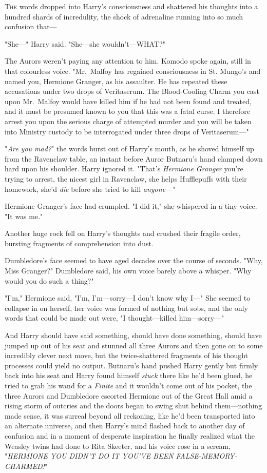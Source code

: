 
\lettrine{T}{he} words dropped into Harry's consciousness and shattered his thoughts into a
hundred shards of incredulity, the shock of adrenaline running into so much
confusion that---

"She---" Harry said. "She---she wouldn't---WHAT?"

The Aurors weren't paying any attention to him. Komodo spoke again, still in
that colourless voice. "Mr.~Malfoy has regained consciousness in St. Mungo's and
named you, Hermione Granger, as his assaulter. He has repeated these
accusations under two drops of Veritaserum. The Blood-Cooling Charm you cast
upon Mr.~Malfoy would have killed him if he had not been found and treated, and
it must be presumed known to you that this was a fatal curse. I therefore
arrest you upon the serious charge of attempted murder and you will be taken
into Ministry custody to be interrogated under three drops of Veritaserum---"

"\emph{Are you mad?}" the words burst out of Harry's mouth, as he shoved
himself up from the Ravenclaw table, an instant before Auror Butnaru's hand
clamped down hard upon his shoulder. Harry ignored it. "That's \emph{Hermione
Granger} you're trying to arrest, the nicest girl in Ravenclaw, she helps
Hufflepuffs with their homework, she'd \emph{die} before she tried to kill
\emph{anyone---}"

Hermione Granger's face had crumpled. "I did it," she whispered in a tiny
voice. "It was me."

Another huge rock fell on Harry's thoughts and crushed their fragile order,
bursting fragments of comprehension into dust.

Dumbledore's face seemed to have aged decades over the course of seconds. "Why,
Miss Granger?" Dumbledore said, his own voice barely above a whisper. "Why
would you do such a thing?"

"I'm," Hermione said, "I'm, I'm---sorry---I don't know why I---" She seemed to
collapse in on herself, her voice was formed of nothing but sobs, and the only
words that could be made out were, "I thought---killed him---sorry---"

And Harry should have said something, should have done something, should have
jumped up out of his seat and stunned all three Aurors and then gone on to some
incredibly clever next move, but the twice-shattered fragments of his thought
processes could yield no output. Butnaru's hand pushed Harry gently but firmly
back into his seat and Harry found himself \emph{stuck} there like he'd been
glued, he tried to grab his wand for a \emph{Finite} and it wouldn't come out
of his pocket, the three Aurors and Dumbledore escorted Hermione out of the
Great Hall amid a rising storm of outcries and the doors began to swing shut
behind them---nothing made sense, it was surreal beyond all reckoning, like
he'd been transported into an alternate universe, and then Harry's mind flashed
back to another day of confusion and in a moment of desperate inspiration he
finally realized what the Weasley twins had done to Rita Skeeter, and his voice
rose in a scream, "\emph{HERMIONE YOU DIDN'T DO IT YOU'VE BEEN
FALSE-MEMORY-CHARMED!}"

